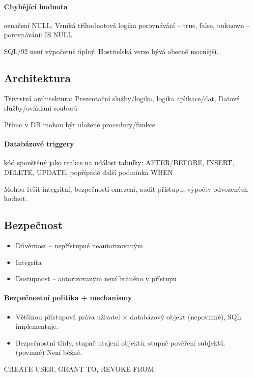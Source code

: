 \documentclass[a4paper, 11pt]{report}
\begin{document}
\paragraph{Chybějící hodnota} označení NULL, Vzniká tříhodnotová logika porovnávání -- true, false, unknown -- porovnávání: IS NULL

SQL/92 není výpočetně úplný. Hostitelská verze bývá obecně mocnější.

\subsection{Architektura}
Třívrstvá architektura: Prezentační služby/logika, logika aplikace/dat, Datové služby/ovládání souborů

Přímo v DB mohou být uložené procedury/funkce

\paragraph{Databázové triggery} kód spouštěný jako reakce na událost tabulky: AFTER/BEFORE, INSERT, DELETE, UPDATE, popřípadě další podmínka WHEN

Mohou řešit integritní, bezpečnosti omezení, audit přístupu, výpočty odvozených hodnot.

\subsection{Bezpečnost}
\begin{itemize}
	\item Důvěrnost -- nepřístupné neautorizovaným
	\item Integrita
	\item Dostupnost -- autorizovaným není bráněno v přístupu
\end{itemize}

\paragraph{Bezpečnostní politika + mechanismy}

\begin{itemize}
	\item Většinou přístupová práva uživatel $\times$ databázový objekt (nepovinné), SQL implementuje.
	\item Bezpečnostní třídy, stupně utajení objektů, stupně pověření subjektů. (povinné) Není běžné.
\end{itemize}

CREATE USER, GRANT TO, REVOKE FROM
\end{document}
